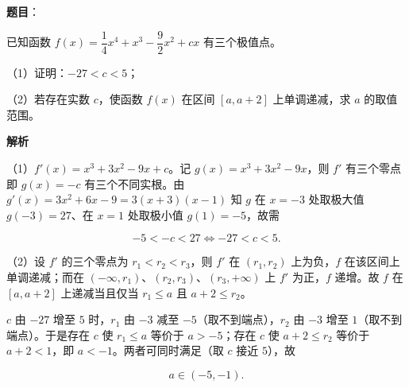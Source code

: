\begin{answer}

\textbf{题目}：

已知函数 $f(x)=\dfrac14x^4+x^3-\dfrac92x^2+cx$ 有三个极值点。

（1）证明：$-27<c<5$；

（2）若存在实数 $c$，使函数 $f(x)$ 在区间 $[a,a+2]$ 上单调递减，求 $a$ 的取值范围。

\textbf{解析}

（1）$f'(x)=x^3+3x^2-9x+c$。记 $g(x)=x^3+3x^2-9x$，则 $f'$ 有三个零点即 $g(x)=-c$ 有三个不同实根。由 $g'(x)=3x^2+6x-9=3(x+3)(x-1)$ 知 $g$ 在 $x=-3$ 处取极大值 $g(-3)=27$、在 $x=1$ 处取极小值 $g(1)=-5$，故需

\nopagebreak[4]
\[-5<-c<27\iff-27<c<5.\]

（2）设 $f'$ 的三个零点为 $r_1<r_2<r_3$，则 $f'$ 在 $(r_1,r_2)$ 上为负，$f$ 在该区间上单调递减；而在 $(-\infty,r_1)$、$(r_2,r_3)$、$(r_3,+\infty)$ 上 $f'$ 为正，$f$ 递增。故 $f$ 在 $[a,a+2]$ 上递减当且仅当 $r_1\leqslant a$ 且 $a+2\leqslant r_2$。

$c$ 由 $-27$ 增至 $5$ 时，$r_1$ 由 $-3$ 减至 $-5$（取不到端点），$r_2$ 由 $-3$ 增至 $1$（取不到端点）。于是存在 $c$ 使 $r_1\leqslant a$ 等价于 $a>-5$；存在 $c$ 使 $a+2\leqslant r_2$ 等价于 $a+2<1$，即 $a<-1$。两者可同时满足（取 $c$ 接近 $5$），故

\nopagebreak[4]
\[a\in(-5,-1).\]


\end{answer}